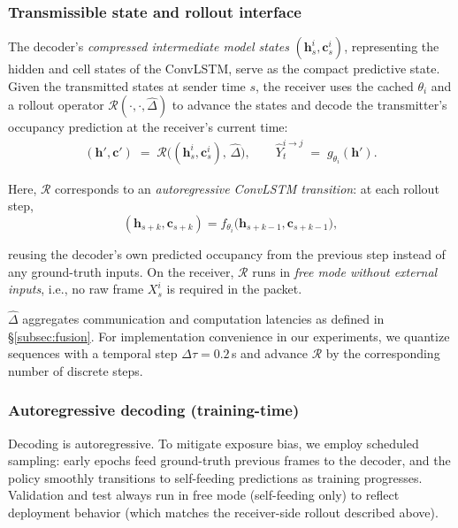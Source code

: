 \subsubsection{Transmissible state and rollout interface}
The decoder’s \emph{compressed intermediate model states} $(\mathbf{h}^i_s,\mathbf{c}^i_s)$, 
representing the hidden and cell states of the ConvLSTM, 
serve as the compact predictive state. 
Given the transmitted states at sender time $s$, the receiver uses the cached $\theta_i$ and a rollout operator $\mathcal{R}(\cdot,\cdot,\widehat{\Delta})$ 
to advance the states and decode the transmitter’s occupancy prediction at the receiver’s current time:
\begin{equation}
\begin{aligned}
(\mathbf{h}',\mathbf{c}') \;=\; \mathcal{R}\!\big((\mathbf{h}^i_s,\mathbf{c}^i_s),\,\widehat{\Delta}\big), 
\qquad
\widehat{Y}^{i\rightarrow j}_{t} \;=\; g_{\theta_i}(\mathbf{h}').
\end{aligned}
\label{eq:state_update_and_prediction}
\end{equation}

Here, $\mathcal{R}$ corresponds to an \emph{autoregressive ConvLSTM transition}: at each rollout step,
\begin{equation}
(\mathbf{h}_{s+k},\mathbf{c}_{s+k}) = f_{\theta_i}\!\big(\mathbf{h}_{s+k-1},\mathbf{c}_{s+k-1}\big),
\label{eq:lstm_update}
\end{equation}

reusing the decoder’s own predicted occupancy from the previous step instead of any ground-truth inputs.
On the receiver, $\mathcal{R}$ runs in \emph{free mode without external inputs}, 
i.e., no raw frame $X^i_s$ is required in the packet.

$\widehat{\Delta}$ aggregates communication and computation latencies as defined in \S\ref{subsec:fusion}. 
For implementation convenience in our experiments, we quantize sequences with a temporal step $\Delta\tau=0.2\,$s and advance $\mathcal{R}$ by the corresponding number of discrete steps.

\subsubsection{Autoregressive decoding (training-time)}
Decoding is autoregressive. To mitigate exposure bias, we employ scheduled sampling: early epochs feed ground-truth previous frames to the decoder, and the policy smoothly transitions to self-feeding predictions as training progresses. Validation and test always run in free mode (self-feeding only) to reflect deployment behavior (which matches the receiver-side rollout described above).







